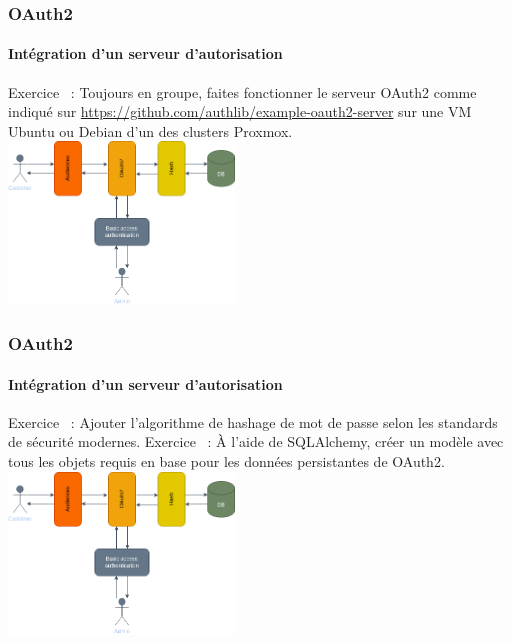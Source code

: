 \documentclass{beamer}
\begin{document}
    \begin{frame}
        \frametitle{OAuth2}
        \framesubtitle{Intégration d'un serveur d'autorisation}
        \transdissolve
        Exercice \execcounterdispinc{}~:
        Toujours en groupe, faites fonctionner le serveur OAuth2 comme indiqué sur \url{https://github.com/authlib/example-oauth2-server} sur une VM Ubuntu ou Debian d'un des clusters Proxmox.
        \bigbreak
        \centering
        \includegraphics[width=6cm]{image/OAuth2-integration.drawio}
    \end{frame}

    \begin{frame}
        \frametitle{OAuth2}
        \framesubtitle{Intégration d'un serveur d'autorisation}
        \transdissolve
        Exercice \execcounterdispinc{}~:
        Ajouter l'algorithme de hashage de mot de passe selon les standards de sécurité modernes.
        \bigbreak
        Exercice \execcounterdispinc{}~:
        À l'aide de SQLAlchemy, créer un modèle avec tous les objets requis en base pour les données persistantes de OAuth2.
        \bigbreak
        \centering
        \includegraphics[width=6cm]{image/OAuth2-integration.drawio}
    \end{frame}
\end{document}
